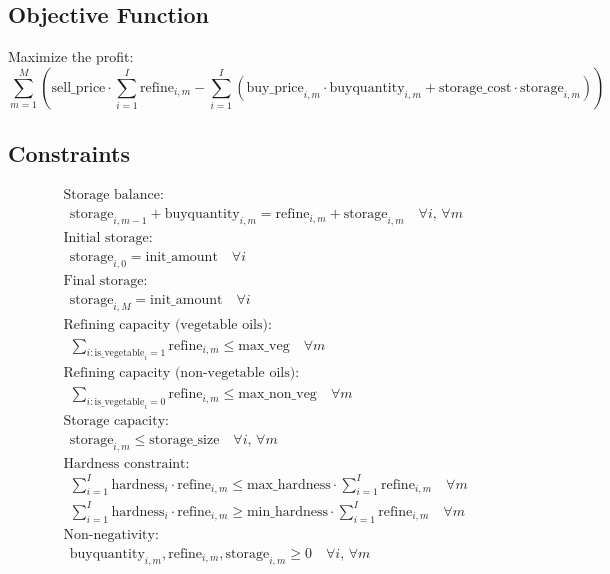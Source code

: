 \documentclass{article}
\begin{document}
\subsection*{Objective Function}
Maximize the profit:
\[
\sum_{m=1}^{M} \left( \text{sell\_price} \cdot \sum_{i=1}^{I} \text{refine}_{i, m} - \sum_{i=1}^{I} \left( \text{buy\_price}_{i, m} \cdot \text{buyquantity}_{i, m} + \text{storage\_cost} \cdot \text{storage}_{i, m} \right) \right)
\]

\subsection*{Constraints}
\begin{align*}
&\text{Storage balance:}\\
&\ \ \text{storage}_{i, m-1} + \text{buyquantity}_{i, m} = \text{refine}_{i, m} + \text{storage}_{i, m} \quad \forall i, \, \forall m \\
&\text{Initial storage:}\\
&\ \ \text{storage}_{i, 0} = \text{init\_amount} \quad \forall i \\
&\text{Final storage:}\\
&\ \ \text{storage}_{i, M} = \text{init\_amount} \quad \forall i \\
&\text{Refining capacity (vegetable oils):}\\
&\ \ \sum_{i: \text{is\_vegetable}_{i} = 1} \text{refine}_{i, m} \leq \text{max\_veg} \quad \forall m \\
&\text{Refining capacity (non-vegetable oils):}\\
&\ \ \sum_{i: \text{is\_vegetable}_{i} = 0} \text{refine}_{i, m} \leq \text{max\_non\_veg} \quad \forall m \\
&\text{Storage capacity:}\\
&\ \ \text{storage}_{i, m} \leq \text{storage\_size} \quad \forall i, \, \forall m \\
&\text{Hardness constraint:}\\
&\ \ \sum_{i=1}^{I} \text{hardness}_{i} \cdot \text{refine}_{i, m} \leq \text{max\_hardness} \cdot \sum_{i=1}^{I} \text{refine}_{i, m} \quad \forall m \\
&\ \ \sum_{i=1}^{I} \text{hardness}_{i} \cdot \text{refine}_{i, m} \geq \text{min\_hardness} \cdot \sum_{i=1}^{I} \text{refine}_{i, m} \quad \forall m \\
&\text{Non-negativity:}\\
&\ \ \text{buyquantity}_{i, m}, \text{refine}_{i, m}, \text{storage}_{i, m} \geq 0 \quad \forall i, \, \forall m \\
\end{align*}
\end{document}
